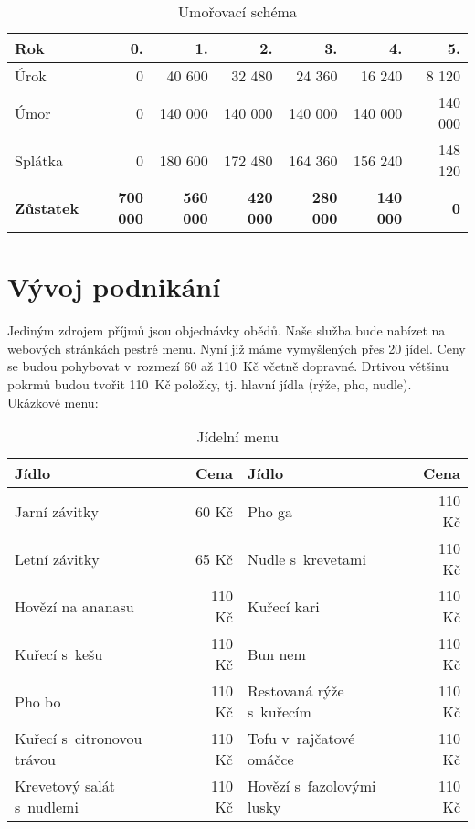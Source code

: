 \begin{table}[htbp]
\begin{center}
\begin{tabular}{ l r r r r r r }

\textbf{Rok} & \textbf{0.} & \textbf{1.} & \textbf{2.} & \textbf{3.} & \textbf{4.} & \textbf{5.} \\ \hline
Úrok & 0 & 40 600 & 32 480 & 24 360 & 16 240 & 8 120 \\
Úmor & 0 & 140 000 & 140 000 & 140 000 & 140 000 & 140 000 \\
Splátka & 0 & 180 600 & 172 480 & 164 360 & 156 240 & 148 120 \\ \hline
\textbf{Zůstatek} & \textbf{700 000} & \textbf{560 000} & \textbf{420 000} & \textbf{280 000} & \textbf{140 000} & \textbf{0} \\

\end{tabular}
\caption{Umořovací schéma}
\label{umorovaci_schema}
\end{center}
\end{table}


\newpage



\section{Vývoj podnikání}
Jediným zdrojem příjmů jsou objednávky obědů. Naše služba bude nabízet na webových stránkách pestré menu. Nyní již máme vymyšlených přes 20 jídel. Ceny se budou pohybovat v~rozmezí 60 až 110~Kč včetně dopravné. Drtivou většinu pokrmů budou tvořit 110~Kč položky, tj. hlavní jídla (rýže, pho, nudle). Ukázkové menu:

\begin{table}[htbp]
\begin{center}
\begin{tabular}{ l r | l r }

\textbf{Jídlo} & \textbf{Cena} & \textbf{Jídlo} & \textbf{Cena} \\ \hline
Jarní závitky & 60 Kč & Pho ga & 110 Kč \\ 
Letní závitky & 65 Kč & Nudle s~krevetami & 110 Kč \\ 
Hovězí na ananasu & 110 Kč & Kuřecí kari & 110 Kč \\ 
Kuřecí s~kešu & 110 Kč & Bun nem & 110 Kč \\ 
Pho bo & 110 Kč & Restovaná rýže s~kuřecím & 110 Kč \\ 
Kuřecí s~citronovou trávou & 110 Kč & Tofu v~rajčatové omáčce & 110 Kč \\ 
Krevetový salát s~nudlemi & 110 Kč & Hovězí s~fazolovými lusky & 110 Kč \\ 

\end{tabular}
\caption{Jídelní menu}
\label{jidelni_menu}
\end{center}
\end{table}

